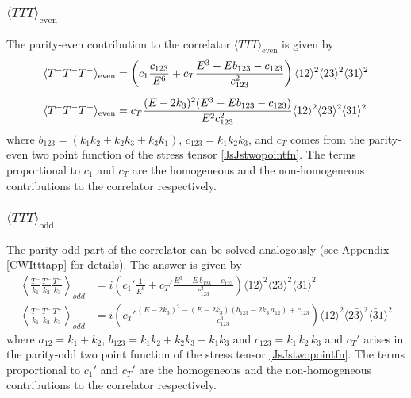 \documentclass[a4paper,11pt]{article}
\begin{document}
\subsubsection*{{\bf{$\langle TTT \rangle_{\text{even}}$}}}
The parity-even contribution to the correlator $\langle TTT \rangle_{\text{even}}$ is given by \cite{Bzowski:2013sza,Baumann:2020dch} 
\begin{align}\label{evenTTTso}
\langle T^-T^-T^- \rangle_{\text{even}} &= \left(c_1 \frac{c_{123}}{E^6}+c_T\frac{E^3-E b_{123}-c_{123}}{c_{123}^2}\right) \langle 12 \rangle^2 \langle 23 \rangle^2 \langle 31 \rangle^2\notag\\[5 pt]
\langle T^-T^-T^+ \rangle_{\text{even}} &= c_T \frac{(E-2k_3)^2(E^3-E b_{123}-c_{123})}{E^2 c_{123}^2} \langle 12 \rangle^2 \langle 2\bar{3} \rangle^2 \langle \bar{3}1 \rangle^2
\end{align}
where $b_{123} = (k_1 k_2+k_2 k_3+k_3 k_1)$, $c_{123} = k_1 k_2 k_3$, and $c_T$ comes from the parity-even two point function of the stress tensor \eqref{JsJstwopointfn}.
The terms proportional to $c_1$ and $c_T$ are the homogeneous  and the non-homogeneous contributions to the correlator respectively.
\subsubsection*{$\langle TTT \rangle_{\text{odd}}$}
The parity-odd part of the correlator can be solved analogously (see Appendix \ref{CWItttapp} for details). The answer is given by 
\begin{align}
\label{tttoddsphresult}
\left\langle \frac{T^-}{k_1}\frac{T^-}{k_2} \frac{T^-}{k_3} \right\rangle_{odd} &=i\left(c_1'\frac{1}{E^6}+c_T'\frac{E^3-E\,b_{123}-c_{123}}{c_{123}^3}\right)\langle 12 \rangle^2 \langle 23 \rangle^2 \langle 31 \rangle^2\\[6 pt]
\left\langle \frac{T^-}{k_1} \frac{T^-}{k_2} \frac{T^+}{k_3} \right\rangle_{odd} &=i \left(c_T'\frac{(E-2k_3)^2-(E-2k_3)(b_{123}-2k_3\,a_{12})+c_{123}}{c_{123}^3}\right)\langle 12 \rangle^2 \langle 2\bar{3} \rangle^2 \langle \bar{3}1 \rangle^2
\end{align}
where  $a_{12}=k_1+k_2$, $b_{123}=k_1k_2+k_2k_3+k_1k_3$ and $c_{123}=k_1\,k_2\,k_3$ and 
$c_T'$ arises in the parity-odd two point function of the stress tensor \eqref{JsJstwopointfn}.
The terms proportional to $c_1'$ and $c_T'$ are the homogeneous  and the non-homogeneous contributions to the correlator respectively.
\end{document}
